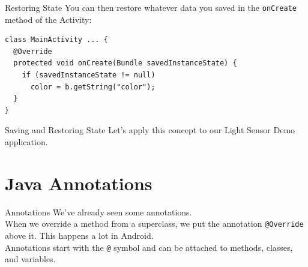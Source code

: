 \documentclass[aspectratio=169]{beamer}
\begin{document}
\begin{frame}[fragile]{Restoring State}
\vspace{1em}
\Large
You can then restore whatever data you saved in the {\tt onCreate} method of the Activity:
\vspace{1em}
{\normalsize
\begin{verbatim}
class MainActivity ... {
  @Override
  protected void onCreate(Bundle savedInstanceState) {
    if (savedInstanceState != null)
      color = b.getString("color");
  }
}
\end{verbatim}
}
\end{frame}



\begin{frame}[fragile]{Saving and Restoring State}
\Large
Let's apply this concept to our Light Sensor Demo application.
\end{frame}



\section*{Java Annotations}



\begin{frame}{Annotations}
\large
We've already seen some annotations. \\
\vspace{2em}
When we override a method from a superclass, we put the annotation \texttt{@Override} above it. This happens a lot in Android. \\
\vspace{2em}
Annotations start with the \texttt{@} symbol and can be attached to methods, classes, and variables. 
\end{frame}
\end{document}
